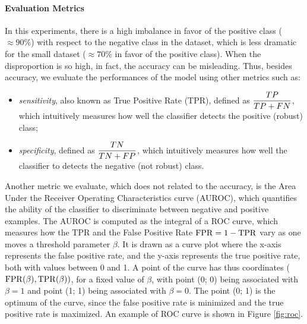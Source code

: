 \paragraph{Evaluation Metrics} In this experiments, there is a high imbalance in favor of the positive class ($\approx 90\%$) with respect to the negative class in the dataset, which is less dramatic for the small dataset ($\approx 70\%$ in favor of the positive class). When the disproportion is so high, in fact, the accuracy can be misleading. Thus, besides accuracy, we evaluate the performances of the model using other metrics such as:
\begin{itemize}
    \item \emph{sensitivity}, also known as True Positive Rate (TPR), defined as ${\displaystyle\frac{TP}{TP + FN}}$, which intuitively measures how well the classifier detects the positive (robust) class;
    \item \emph{specificity}, defined as ${\displaystyle\frac{TN}{TN + FP}}$, which intuitively measures how well the classifier to detects the negative (not robust) class.
\end{itemize}
Another metric we evaluate, which does not related to the accuracy, is the Area Under the Receiver Operating Characteristics curve (AUROC), which quantifies the ability of the classifier to discriminate between negative and positive examples. The AUROC is computed as the integral of a ROC curve, which measures how the TPR and the False Positive Rate $\mathrm{FPR} = 1 - \mathrm{TPR}$ vary as one moves a threshold parameter $\beta$. It is drawn as a curve plot where the x-axis represents the false positive rate, and the y-axis represents the true positive rate, both with values between 0 and 1. A point of the curve has thus coordinates ($\mathrm{FPR}(\beta), \mathrm{TPR}(\beta))$, for a fixed value of $\beta$, with point (0; 0) being associated with $\beta = 1$ and point (1; 1) being associated with $\beta = 0$. The point (0; 1) is the optimum of the curve, since the false positive rate is minimized and the true positive rate is maximized. An example of ROC curve is shown in Figure \ref{fig:roc}.

